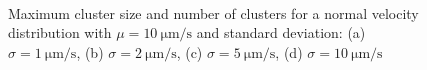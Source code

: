 \documentclass[../../master_thesis_np.tex]{subfiles}
\begin{document}
		\begin{figure}[t]
			\centering
			\ContinuedFloat
			\\
			
			\caption{Maximum cluster size and number of clusters for a normal velocity distribution with $\mu = \SI{10}{\um\per\second}$ and standard deviation: (a) $\sigma = \SI{1}{\um\per\second}$, (b) $\sigma = \SI{2}{\um\per\second}$, (c) $\sigma = \SI{5}{\um\per\second}$, (d) $\sigma = \SI{10}{\um\per\second}$}
			\label{fig:lj_vdist_clust}
		\end{figure}
		
\end{document}
